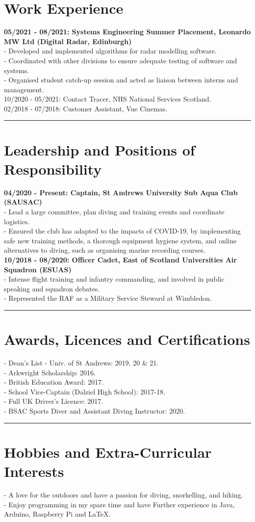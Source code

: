 \documentclass[10pt,A4,english]{article}
\begin{document}
\section*{Work Experience}
\textbf{05/2021 - 08/2021: Systems Engineering Summer Placement, Leonardo MW Ltd (Digital Radar, Edinburgh)}\\
 - Developed and implemented algorithms for radar modelling software.\\
 - Coordinated with other divisions to ensure adequate testing of software and systems.\\
 - Organised student catch-up session and acted as liaison between interns and management.\\

10/2020 - 05/2021: Contact Tracer, NHS National Services Scotland.\\
02/2018 - 07/2018: Customer Assistant, Vue Cinemas.
\vspace{4pt}
\hrule height 1pt\relax


\section*{Leadership and Positions of Responsibility}
\textbf{04/2020 - Present: Captain, St Andrews University Sub Aqua Club (SAUSAC)}\\
 - Lead a large committee, plan diving and training events and coordinate logistics.\\
 - Ensured the club has adapted to the impacts of COVID-19, by implementing safe new training methods, a thorough equipment hygiene system, and online alternatives to diving, such as organising marine recording courses.\\

\textbf{10/2018 - 08/2020: Officer Cadet, East of Scotland Universities Air Squadron (ESUAS)}\\
 - Intense flight training and infantry commanding, and involved in public speaking and squadron debates.\\
 - Represented the RAF as a Military Service Steward at Wimbledon.
\vspace{4pt}
\hrule height 1pt\relax


\section*{Awards, Licences and Certifications}
\begin{multicols}{2}
 - Dean’s List - Univ. of St Andrews: 2019, 20 \& 21.\\
 - Arkwright Scholarship: 2016.\\
 - British Education Award: 2017.\\
 - School Vice-Captain (Dalziel High School): 2017-18.\\
 - Full UK Driver's Licence: 2017.\\
 - BSAC Sports Diver and Assistant Diving Instructor: 2020.
\end{multicols}
\hrule height 1pt\relax


\section*{Hobbies and Extra-Curricular Interests}
 - A love for the outdoors and have a passion for diving, snorkelling, and hiking.\\
 - Enjoy programming in my spare time and have Further experience in Java, Arduino, Raspberry Pi and \LaTeX.
\end{document}
